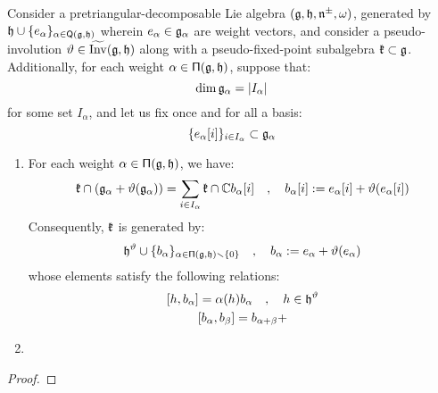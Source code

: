         \begin{lemma} \label{lemma: adjoint_actions_of_pseudo_fixed_point_subalgebras}
            Consider a pretriangular-decomposable Lie algebra $(\mathfrak{g}, \mathfrak{h}, \mathfrak{n}^{\pm}, \omega)$, generated by $\mathfrak{h} \cup \{e_{\alpha}\}_{\alpha \in \mathsf{Q}(\mathfrak{g}, \mathfrak{h})}$ wherein $e_{\alpha} \in \mathfrak{g}_{\alpha}$ are weight vectors, and consider a pseudo-involution $\vartheta \in \widetilde{\operatorname{Inv}}(\mathfrak{g}, \mathfrak{h})$ along with a pseudo-fixed-point subalgebra $\mathfrak{k} \subset \mathfrak{g}$. Additionally, for each weight $\alpha \in \mathsf{\Pi}(\mathfrak{g}, \mathfrak{h})$, suppose that:
                $$\dim \mathfrak{g}_{\alpha} = |I_{\alpha}|$$
            for some set $I_{\alpha}$, and let us fix once and for all a basis:
                $$\{e_{\alpha}[i]\}_{i \in I_{\alpha}} \subset \mathfrak{g}_{\alpha}$$
            \begin{enumerate}
                \item For each weight $\alpha \in \mathsf{\Pi}(\mathfrak{g}, \mathfrak{h})$, we have:
                    \begin{equation}
                        \mathfrak{k} \cap ( \mathfrak{g}_{\alpha} + \vartheta(\mathfrak{g}_{\alpha}) ) = \sum_{i \in I_{\alpha}} \mathfrak{k} \cap \mathbb{C} b_{\alpha}[i] \quad, \quad b_{\alpha}[i] := e_{\alpha}[i] + \vartheta( e_{\alpha}[i] )
                    \end{equation}
                Consequently, $\mathfrak{k}$ is generated by:
                    \begin{equation} \label{equation: pseudo_fixed_generators}
                        \mathfrak{h}^{\vartheta} \cup \{ b_{\alpha} \}_{\alpha \in \mathsf{\Pi}(\mathfrak{g}, \mathfrak{h}) \smallsetminus \{0\}} \quad, \quad b_{\alpha} := e_{\alpha} + \vartheta( e_{\alpha} )
                    \end{equation}
                whose elements satisfy the following relations:
                    \begin{equation} \label{equation: pseudo_fixed_relations}
                        \begin{gathered}
                            [h, b_{\alpha}] = \alpha(h) b_{\alpha} \quad, \quad h \in \h^{\vartheta}
                            \\
                            [b_{\alpha}, b_{\beta}] = b_{\alpha + \beta} + 
                        \end{gathered}
                    \end{equation}
                \item 
            \end{enumerate}
        \end{lemma}
            \begin{proof}
                
            \end{proof}

